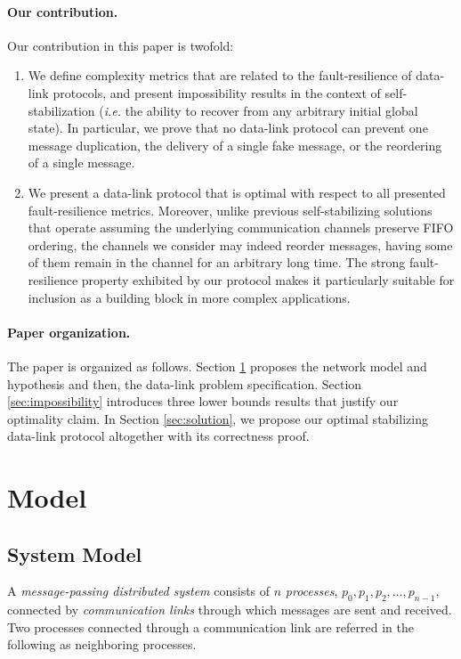 \documentclass[11pt]{article}
\begin{document}
\paragraph{Our contribution.} Our contribution in this paper is twofold:
\begin{enumerate}
\item We define complexity metrics that are related to the fault-resilience of data-link protocols, and present impossibility results in the context of self-stabilization (\emph{i.e.} the ability to recover from any arbitrary initial global state). In particular, we prove that no data-link protocol can prevent one message duplication, the delivery of a single fake message, or the reordering of a single message.
\item We present a data-link protocol that is optimal with respect to all presented fault-resilience metrics. Moreover, unlike previous self-stabilizing solutions that operate assuming the underlying communication channels preserve FIFO ordering, the channels we consider may indeed reorder messages, having some of them remain in the channel for an arbitrary long time. The strong fault-resilience property exhibited by our protocol makes it particularly suitable for inclusion as a building block in more complex applications.
\end{enumerate}

\paragraph{Paper organization.} The paper is organized as follows. Section \ref{sec:model} proposes the network model and hypothesis and then, the data-link problem specification. Section \ref{sec:impossibility} introduces three lower bounds results that justify our optimality claim. In Section \ref{sec:solution}, we propose our optimal stabilizing data-link protocol altogether with its correctness proof.

\section{Model}\label{sec:model}

\subsection{System Model}

A \emph{message-passing distributed system} consists of $n$ {\em processes}, $p_0,p_1,p_2,\ldots,p_{n-1}$, connected by {\em communication links} through which messages are sent and received. Two processes connected through a communication link are referred in the following as neighboring processes.
\end{document}
